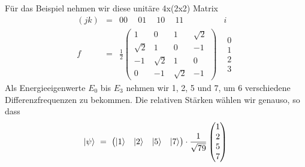 \documentclass[12pt]{article}
\begin{document}
Für das Beispiel nehmen wir diese unitäre 4x(2x2) Matrix
\begin{equation*}
\begin{matrix}
(jk) & = & 00\quad \ 01\quad \ 10\quad \ 11 & i \\
f & = & \frac{1}{2}
\begin{pmatrix}
\label{eq:f}
1 & 0 & 1 & \sqrt{2} \\
\sqrt{2} & 1 & 0 & -1 \\
-1 & \sqrt{2} & 1 & 0 \\
0 & -1 & \sqrt{2} & -1
\end{pmatrix} 
& \begin{matrix}0\\1\\2\\3\end{matrix}
\end{matrix}
\end{equation*}
Als Energieeigenwerte $E_0$ bis $E_3$ nehmen wir 1, 2, 5 und 7, um 6 verschiedene Differenzfrequenzen zu bekommen. Die relativen Stärken wählen wir genauso, so dass
\begin{equation*}
\ket{\psi}\ =\ \begin{pmatrix}
\ket{1} & \ket{2} & \ket{5} & \ket{7}
\end{pmatrix}
\cdot \frac{1}{\sqrt{79}}
\begin{pmatrix}
1 \\ 2 \\ 5 \\ 7
\end{pmatrix}
\end{equation*}
\end{document}
